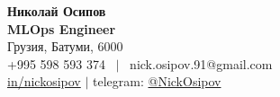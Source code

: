 \documentclass[letterpaper,12pt,english,russian]{fed-res} %
\begin{document}
\begin{center}
    \textbf{\Huge Николай Осипов} \\ \vspace{1pt}
    \textbf{MLOps Engineer} \\ \vspace{1pt}
    Грузия, Батуми, 6000 \\ \vspace{1pt}
    +995 598 593 374 \ $|$ \ nick.osipov.91@gmail.com \\ \vspace{1pt}
    \href{https://www.linkedin.com/in/nickosipov/}{in/nickosipov} $|$ telegram: \href{https://t.me/NickOsipov}{@NickOsipov} \\ \vspace{1pt}
\end{center}







\end{document}
